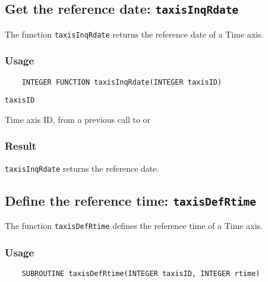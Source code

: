 \subsection{Get the reference date: {\tt taxisInqRdate}}
\label{taxisInqRdate}

The function {\tt taxisInqRdate} returns the reference date of a Time axis.

\subsubsection*{Usage}

\begin{verbatim}
    INTEGER FUNCTION taxisInqRdate(INTEGER taxisID)
\end{verbatim}

\hspace*{4mm}\begin{minipage}[]{15cm}
\begin{deflist}{\tt taxisID\ }
\item[{\tt taxisID}]
Time axis ID, from a previous call to {} or {}

\end{deflist}
\end{minipage}

\subsubsection*{Result}

{\tt taxisInqRdate} returns the reference date.



\subsection{Define the reference time: {\tt taxisDefRtime}}
\label{taxisDefRtime}

The function {\tt taxisDefRtime} defines the reference time of a Time axis.

\subsubsection*{Usage}

\begin{verbatim}
    SUBROUTINE taxisDefRtime(INTEGER taxisID, INTEGER rtime)
\end{verbatim}

